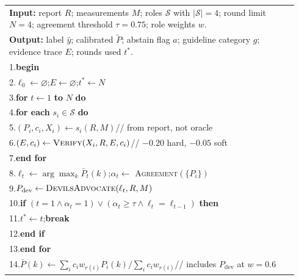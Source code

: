 \documentclass[12pt]{article}
\begin{document}
\begin{center}
\small
\renewcommand{\arraystretch}{1.35}
\begin{tabular}{|p{0.94\linewidth}|}
\hline
\textbf{Input:} report $R$; measurements $M$; roles $\mathcal{S}$ with $|\mathcal{S}|=4$; round limit $N=4$; agreement threshold $\tau=0.75$; role weights $w$. \\
\textbf{Output:} label $\hat y$; calibrated $\tilde P$; abstain flag $a$; guideline category $g$; evidence trace $E$; rounds used $t^{*}$. \\
1.\quad \textbf{begin} \\
2.\quad \hspace*{1.5em}$\ell_0 \gets \varnothing$;\quad $E \gets \varnothing$;\quad $t^{*} \gets N$ \\
3.\quad \hspace*{1.5em}\textbf{for} $t \gets 1$ \textbf{to} $N$ \textbf{do} \\
4.\quad \hspace*{3em}\textbf{for each} $s_i \in \mathcal{S}$ \textbf{do} \\
5.\quad \hspace*{4.5em}$(P_i, c_i, X_i) \gets s_i(R, M)$\quad // from report, not oracle \\
6.\quad \hspace*{4.5em}$(E, c_i) \gets \textsc{Verify}(X_i, R, E, c_i)$\quad // $-0.20$ hard, $-0.05$ soft \\
7.\quad \hspace*{3em}\textbf{end for} \\
8.\quad \hspace*{3em}$\ell_t \gets \arg\max_k \bar P_t(k)$;\quad $\alpha_t \gets$ \textsc{Agreement}$(\{P_i\})$ \\
9.\quad \hspace*{3em}$P_{\mathrm{dev}} \gets \textsc{DevilsAdvocate}(\ell_t, R, M)$ \\
10.\quad \hspace*{3em}\textbf{if} $(t = 1 \wedge \alpha_t = 1) \vee (\alpha_t \ge \tau \wedge \ell_t = \ell_{t-1})$ \textbf{then} \\
11.\quad \hspace*{4.5em}$t^{*} \gets t$;\quad \textbf{break} \\
12.\quad \hspace*{3em}\textbf{end if} \\
13.\quad \hspace*{1.5em}\textbf{end for} \\
14.\quad \hspace*{1.5em}$\bar P(k) \gets \sum_i c_i w_{r(i)} P_i(k) / \sum_i c_i w_{r(i)}$\quad // includes $P_{\mathrm{dev}}$ at $w=0.6$ \\

\end{tabular}
\end{center}
\end{document}
